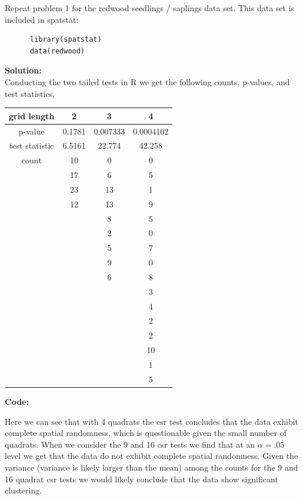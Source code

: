 \documentclass[12pt]{article}
\makeatletter
\theoremstyle{homework}
\newenvironment{exercise}[1]
{\def\@currentlabel{#1}\exercisecore}
{\endexercisecore}
\newcommand{\localhead}[1]{\par\smallskip\noindent\textbf{#1}\nobreak\\}%
\newcommand\solution{\localhead{Solution:}}
\makeatother
\begin{document}
\begin{exercise}{2} Repeat problem 1 for the redwood seedlings / saplings data set. 
  This data set is included in spatstat:
  \begin{footnotesize}
    \begin{verbatim}
      library(spatstat)
      data(redwood)
    \end{verbatim}
    \end{footnotesize}  
    \solution
    Conducting the two tailed tests in R we get the following counts, p-values, and test statistics, 

    \begin{center}
      \begin{tabular}{c|| c c c}
          grid length & 2 & 3 & 4\\
        \hline 
        p-value        &  0.1781 & 0.007333 &  0.0004102\\
        test statistic & 6.5161 & 22.774   & 42.258\\
        count          & 10       &   0       & 0 \\
                       & 17      &   6       & 5 \\
                       & 23      &   13      & 1 \\
                       & 12      &   13      & 9\\
                       &         &   8       & 5 \\
                       &         &   2      & 0 \\
                       &         &   5       & 7 \\
                       &         &   9       & 0\\
                       &         &   6      & 8 \\  
                       &         &          & 3 \\          
                       &         &          & 4 \\          
                       &         &          & 2\\
                       &         &          & 2 \\ 
                       &         &          & 10\\          
                       &         &          & 1 \\          
                       &         &          & 5        
       \end{tabular}
      \end{center}
      \textbf{Code:}
      \begin{center}
      
      \end{center}
      Here we can see that with 4 quadrats the csr test concludes that the data exhibit complete spatial randomness, which is questionable given the small number of quadrats. When we consider the 
      9 and 16 csr tests we find that at an $\alpha = .05$ level we get that the data do not exhibit complete spatial randomness. Given the variance (variance is likely larger than the mean) among the counts for 
      the 9 and 16 quadrat csr tests we would likely conclude that the data show significant clustering.  
\end{exercise}
\end{document}
